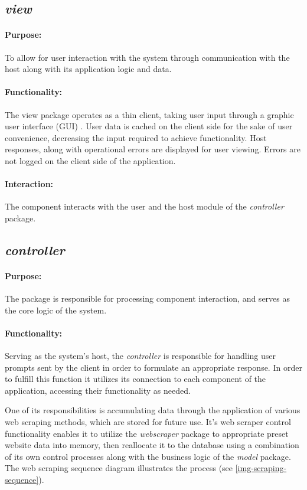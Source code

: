 \documentclass{thesis-ekf}
\theoremstyle{definition}
\theoremstyle{remark}
\begin{document}
\subsection{\emph{view}}
\paragraph{Purpose:}
To allow for user interaction with the system through communication with the host along with its application logic and data.

\paragraph{Functionality:}
The view package operates as a thin client, taking user input through a graphic user interface (GUI) \cite{Wiki-GUI}. User data is cached on the client side for the sake of user convenience, decreasing the input required to achieve functionality. Host responses, along with operational errors are displayed for user viewing. Errors are not logged on the client side of the application.

\paragraph{Interaction:}
The component interacts with the user and the host module of the \emph{controller} package.



\subsection{\emph{controller}}
\paragraph{Purpose:}
The package is responsible for processing component interaction, and serves as the core logic of the system.

\paragraph{Functionality:}
Serving as the system's host, the \emph{controller} is responsible for handling user prompts sent by the client in order to formulate an appropriate response. In order to fulfill this function it utilizes its connection to each component of the application, accessing their functionality as needed.

One of its responsibilities is accumulating data through the application of various web scraping methods, which are stored for future use. It's web scraper control functionality enables it to utilize the \emph{webscraper} package to appropriate preset website data into memory, then reallocate it to the database using a combination of its own control processes along with the business logic of the \emph{model} package. The web scraping sequence diagram illustrates the process (see {\ref{img-scraping-sequence}}).
\end{document}
